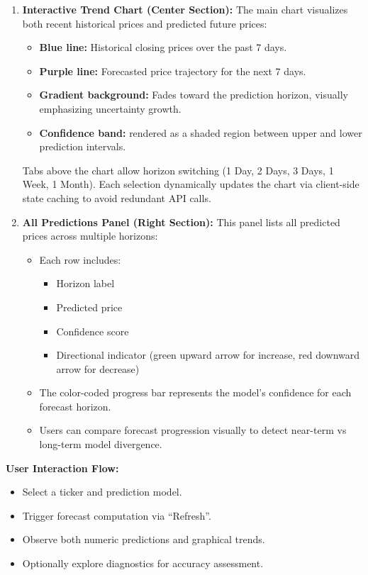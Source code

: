 \begin{enumerate}
\item \textbf{Interactive Trend Chart (Center Section):}
  The main chart visualizes both recent historical prices and predicted future prices:
  \begin{itemize}
  \item \textbf{Blue line:} Historical closing prices over the past 7 days.
  \item \textbf{Purple line:} Forecasted price trajectory for the next 7 days.
  \item \textbf{Gradient background:} Fades toward the prediction horizon, visually emphasizing uncertainty growth.
  \item \textbf{Confidence band:} rendered as a shaded region between upper and lower prediction intervals.
  \end{itemize}
  Tabs above the chart allow horizon switching (1 Day, 2 Days, 3 Days, 1 Week, 1 Month). Each selection dynamically updates the chart via client-side state caching to avoid redundant API calls.

\item \textbf{All Predictions Panel (Right Section):}
  This panel lists all predicted prices across multiple horizons:
  \begin{itemize}
  \item Each row includes:
    \begin{itemize}
    \item Horizon label 
    \item Predicted price 
    \item Confidence score 
    \item Directional indicator (green upward arrow for increase, red downward arrow for decrease)
    \end{itemize}
  \item The color-coded progress bar represents the model’s confidence for each forecast horizon.
  \item Users can compare forecast progression visually to detect near-term vs long-term model divergence.
  \end{itemize}
\end{enumerate}


\textbf{User Interaction Flow:}
\begin{itemize}
  \item Select a ticker and prediction model.
  \item Trigger forecast computation via “Refresh”.
  \item Observe both numeric predictions and graphical trends.
  \item Optionally explore diagnostics for accuracy assessment.
\end{itemize}

